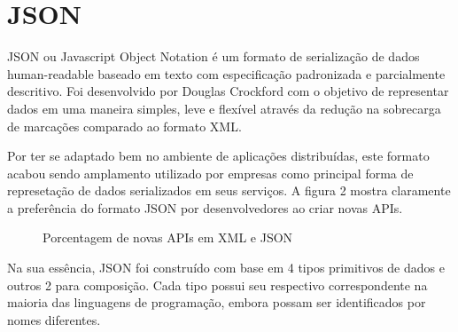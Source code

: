 \section{JSON}

JSON ou Javascript Object Notation é um formato de serialização de dados human-readable baseado em texto com especificação padronizada e parcialmente descritivo. Foi desenvolvido por Douglas Crockford com o objetivo de representar dados em uma maneira simples, leve e flexível através da redução na sobrecarga de marcações comparado ao formato XML.

Por ter se adaptado bem no ambiente de aplicações distribuídas, este formato acabou sendo amplamento utilizado por empresas como principal forma de represetação de dados serializados em seus serviços. A figura 2 mostra claramente a preferência do formato JSON por desenvolvedores ao criar novas APIs. \cite{Duvander2013}

\begin{figure}[H]
  \centering
  \caption{Porcentagem de novas APIs em XML e JSON}
\end{figure}

Na sua essência, JSON foi construído com base em 4 tipos primitivos de dados e outros 2 para composição. Cada tipo possui seu respectivo correspondente na maioria das linguagens de programação, embora possam ser identificados por nomes diferentes. \cite{Droettboom2015}

